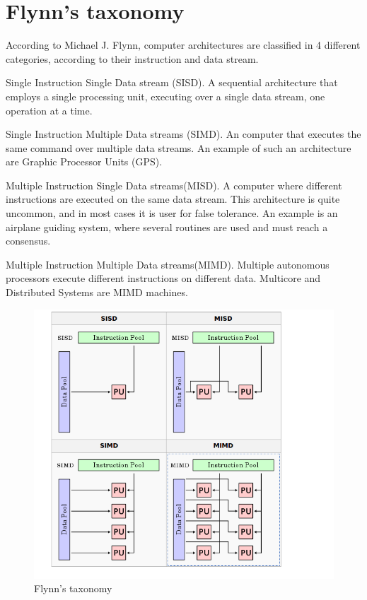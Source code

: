 \section{Flynn's taxonomy}
According to Michael J. Flynn, computer architectures are classified in 4 different categories, according to their instruction and data stream. 


Single Instruction Single Data stream (SISD). 
	A sequential architecture that employs a single processing unit, executing over a single data stream, one operation at a time. 

Single Instruction Multiple Data streams (SIMD).
	An computer  that executes the same command over multiple data streams. An example of such an architecture are Graphic Processor Units (GPS).

Multiple Instruction Single Data streams(MISD).
	A computer where different instructions are executed on the same data stream. This architecture is quite uncommon, and in most cases it is user for false tolerance. An example is an airplane guiding system, where several routines are used and must reach a consensus.

Multiple Instruction Multiple Data streams(MIMD).
	Multiple autonomous processors execute different instructions on different data. Multicore and Distributed Systems are MIMD machines.


\begin{figure}
 \centering
  \includegraphics[scale=0.4]{flynsTaxonomy.png}
\caption{Flynn's taxonomy}
\label{Flynn's taxonomy}
\end{figure}

